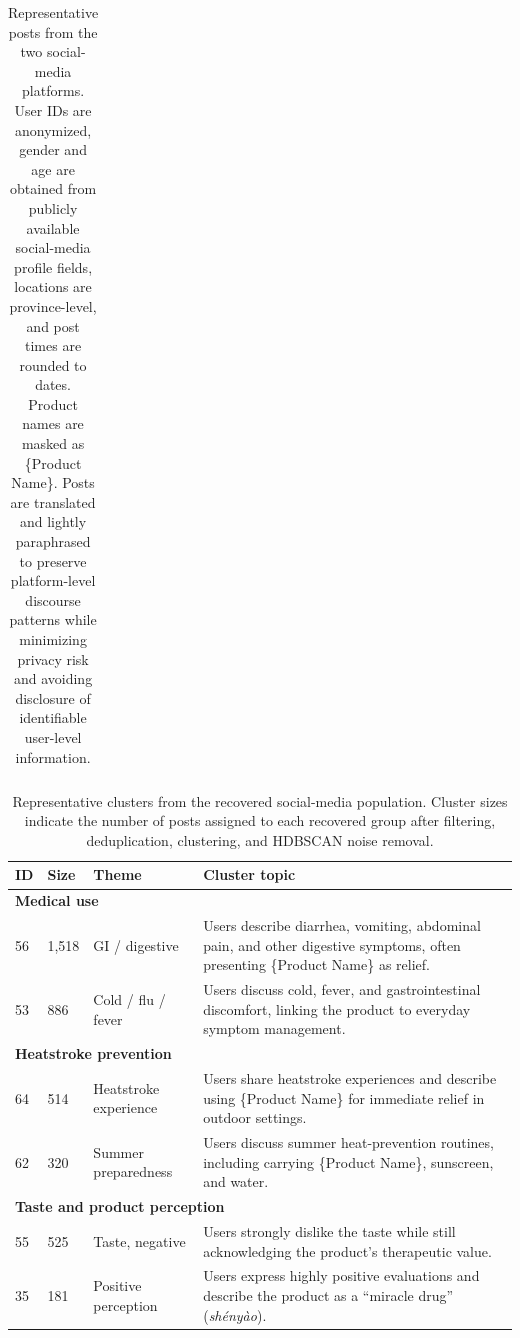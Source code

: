 \documentclass{article}
\begin{document}
\begin{table}[htb!]
\begin{tabular}{p{}p{}p{}p{}p{}p{}}
\bottomrule
\end{tabular}
\caption{Representative posts from the two social-media platforms. User IDs are anonymized, gender and age are obtained from publicly available social-media profile fields, locations are province-level, and post times are rounded to dates. Product names are masked as \{Product Name\}. Posts are translated and lightly paraphrased to preserve platform-level discourse patterns while minimizing privacy risk and avoiding disclosure of identifiable user-level information.}
\label{tab:sm_examples}
\end{table}

\begin{table}[t]
\centering
\small
\begin{tabular}{p{}p{}p{}p{}}
\toprule
ID & Size & Theme & Cluster topic \\
\midrule

\multicolumn{4}{l}{\textbf{Medical use}} \\
\midrule
56 & 1{,}518 & GI / digestive &
Users describe diarrhea, vomiting, abdominal pain, and other digestive symptoms, often presenting \{Product Name\} as relief. \\[3pt]

53 & 886 & Cold / flu / fever &
Users discuss cold, fever, and gastrointestinal discomfort, linking the product to everyday symptom management. \\

\midrule
\multicolumn{4}{l}{\textbf{Heatstroke prevention}} \\
\midrule
64 & 514 & Heatstroke experience &
Users share heatstroke experiences and describe using \{Product Name\} for immediate relief in outdoor settings. \\[3pt]

62 & 320 & Summer preparedness &
Users discuss summer heat-prevention routines, including carrying \{Product Name\}, sunscreen, and water. \\

\midrule
\multicolumn{4}{l}{\textbf{Taste and product perception}} \\
\midrule
55 & 525 & Taste, negative &
Users strongly dislike the taste while still acknowledging the product's therapeutic value. \\[3pt]

35 & 181 & Positive perception &
Users express highly positive evaluations and describe the product as a ``miracle drug'' (\emph{sh\'{e}ny\`{a}o}). \\

\bottomrule
\end{tabular}
\caption{Representative clusters from the recovered social-media population. Cluster sizes indicate the number of posts assigned to each recovered group after filtering, deduplication, clustering, and HDBSCAN noise removal.}
\label{tab:clusters}
\end{table}
\end{document}
